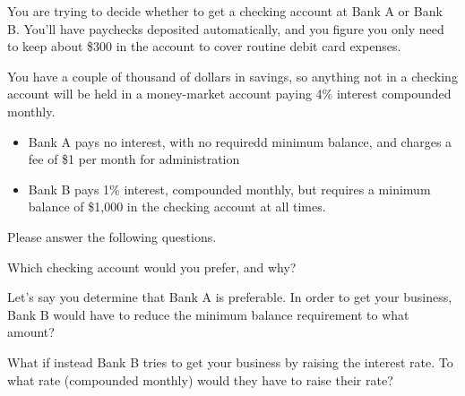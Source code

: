 \documentclass[12pt]{exam}
\begin{document}

You are trying to decide whether to get a checking account at Bank A or Bank B.  You'll have
paychecks deposited automatically, and you figure you only need to keep about \$300 in
the account to cover routine debit card expenses.
\vspace{.25in}

You have a couple of thousand of dollars in savings, so anything not in a checking account
will be held in a money-market account paying 4\% interest compounded monthly.

\begin{itemize}
    \item Bank A pays no interest, with no requiredd minimum balance, and charges a fee
          of \$1 per month for administration
    \item Bank B pays 1\% interest, compounded monthly, but requires a minimum balance
          of \$1,000 in the checking account at all times.
\end{itemize}

\begin{flushleft}
Please answer the following questions.
\end{flushleft}

\begin{questions}

    \question Which checking account would you prefer, and why?
    \vspace{2in}

    \question Let's say you determine that Bank A is preferable.  In order to get
              your business,  Bank B would have to reduce the minimum balance requirement to what amount?
    \vspace{2in}

    \question What if instead Bank B tries to get your business by raising the interest rate. To what rate
              (compounded monthly) would they have to raise their rate?

\end{questions}
\end{document}
